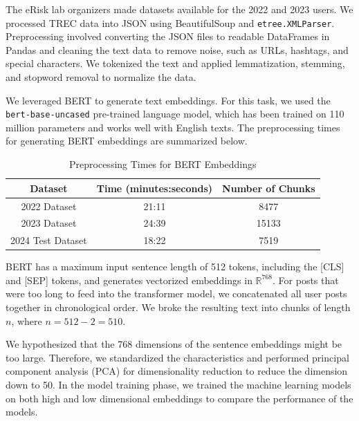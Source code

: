 \documentclass[]{style/ceurart}
\begin{document}
The eRisk lab organizers made datasets available for the 2022 and 2023 users.
We processed TREC data into JSON using BeautifulSoup and \texttt{etree.XMLParser}.
Preprocessing involved converting the JSON files to readable DataFrames in Pandas and cleaning the text data to remove noise, such as URLs, hashtags, and special characters.
We tokenized the text and applied lemmatization, stemming, and stopword removal to normalize the data.

We leveraged BERT to generate text embeddings.
For this task, we used the \texttt{bert-base-uncased} \cite{noauthor_google-bertbert-base-uncased_nodate} pre-trained language model, which has been trained on 110 million parameters and works well with English texts. The preprocessing times for generating BERT embeddings are summarized below.

\begin{table}[h]
\centering
\caption{Preprocessing Times for BERT Embeddings}
\begin{tabular}{|c|c|c|}
\hline
\textbf{Dataset} & \textbf{Time (minutes:seconds)} & \textbf{Number of Chunks} \\ \hline
2022 Dataset     & 21:11                          & 8477                      \\ \hline
2023 Dataset     & 24:39                          & 15133                     \\ \hline
2024 Test Dataset& 18:22                          & 7519                      \\ \hline
\end{tabular}
\label{table:preprocessing_times}
\end{table}

BERT has a maximum input sentence length of 512 tokens, including the [CLS] and [SEP] tokens, and generates vectorized embeddings in $\mathbb{R}^{768}$.
For posts that were too long to feed into the transformer model, we concatenated all user posts together in chronological order. We broke the resulting text into chunks of length $n$, where $n = 512 - 2 = 510$.

We hypothesized that the 768 dimensions of the sentence embeddings might be too large.
Therefore, we standardized the characteristics and performed principal component analysis (PCA) for dimensionality reduction \cite{fodor_survey_2002} to reduce the dimension down to 50.
In the model training phase, we trained the machine learning models on both high and low dimensional embeddings to compare the performance of the models.
\end{document}
